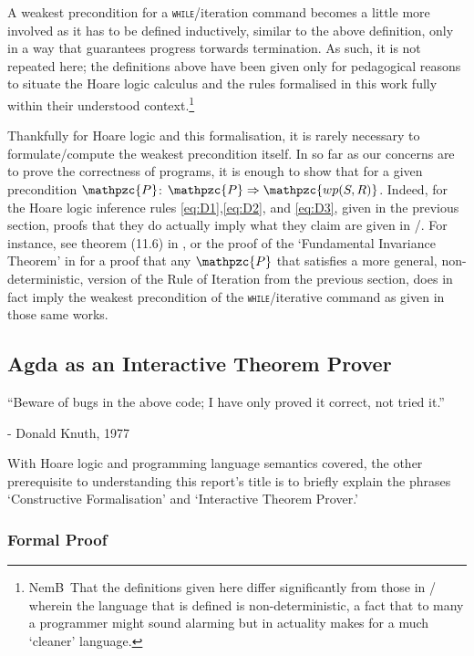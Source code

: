 \documentclass[oneside,12pt]{article}
\newcommand\NB[1][0.1]{N\kern-#1emB \,} %
\newcommand{\impcode}[1]{\textsc{\texttt{#1}}}
\newcommand{\textM}[1]{\ensuremath{\mathpzc{#1}}}
\begin{document}
A weakest precondition for a \impcode{while}/iteration command becomes a little more involved as it has to be defined inductively, similar to the above definition, only in a way that guarantees progress torwards termination. As such, it is not repeated here; the definitions above have been given only for pedagogical reasons to situate the Hoare logic calculus and the rules formalised in this work fully within their understood context.\footnote{\NB That the definitions given here differ significantly from those in \cite{Dijkstra75}/\cite{Dijkstra76} wherein the language that is defined is non-deterministic, a fact that to many a programmer might sound alarming but in actuality makes for a much `cleaner' language.}

Thankfully for Hoare logic and this formalisation, it is rarely necessary to formulate/compute the weakest precondition itself. In so far as our concerns are to prove the correctness of programs, it is enough to show that for a given precondition \textM{P}: $\textM{P} \Rightarrow \textM{wp(S,R)}$. Indeed, for the Hoare logic inference rules \ref{eq:D1},\ref{eq:D2}, and \ref{eq:D3},  given in the previous section, proofs that they do actually imply what they claim are given in \cite{Dijkstra76}/\cite{Gries81}. For instance, see theorem (11.6) in \cite{Gries81}, or the proof of the `Fundamental Invariance Theorem' in \cite{Dijkstra76} for a proof that any \textM{P} that satisfies a more general, non-deterministic, version of the Rule of Iteration from the previous section, does in fact imply the weakest precondition of the \impcode{while}/iterative command as given in those same works.


\subsection{Agda as an Interactive Theorem Prover}


\epigraph{ ``Beware of bugs in the above code; I have only proved it correct, not tried it.''}{ \scriptsize - Donald Knuth, 1977}


With Hoare logic and programming language semantics covered, the other prerequisite to understanding this report's title is to briefly explain the phrases `Constructive Formalisation' and `Interactive Theorem Prover.'

\subsubsection{Formal Proof}
\end{document}
